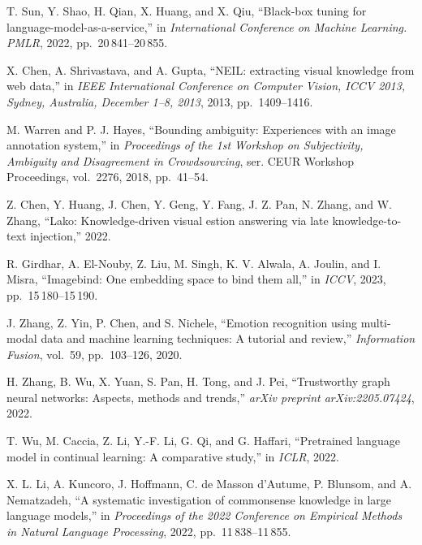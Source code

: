 \begin{enumerate}[leftmargin=2em,label={[\arabic*]}]
\item T. Sun, Y. Shao, H. Qian, X. Huang, and X. Qiu, ``Black-box tuning for language-model-as-a-service,'' in \textit{International Conference on Machine Learning. PMLR}, 2022, pp.~20\,841--20\,855.

\item X. Chen, A. Shrivastava, and A. Gupta, ``NEIL: extracting visual knowledge from web data,'' in \textit{IEEE International Conference on Computer Vision, ICCV 2013, Sydney, Australia, December 1--8, 2013}, 2013, pp.~1409--1416.

\item M. Warren and P. J. Hayes, ``Bounding ambiguity: Experiences with an image annotation system,'' in \textit{Proceedings of the 1st Workshop on Subjectivity, Ambiguity and Disagreement in Crowdsourcing}, ser. CEUR Workshop Proceedings, vol.~2276, 2018, pp.~41--54.

\item Z. Chen, Y. Huang, J. Chen, Y. Geng, Y. Fang, J. Z. Pan, N. Zhang, and W. Zhang, ``Lako: Knowledge-driven visual estion answering via late knowledge-to-text injection,'' 2022.

\item R. Girdhar, A. El-Nouby, Z. Liu, M. Singh, K. V. Alwala, A. Joulin, and I. Misra, ``Imagebind: One embedding space to bind them all,'' in \textit{ICCV}, 2023, pp.~15\,180--15\,190.

\item J. Zhang, Z. Yin, P. Chen, and S. Nichele, ``Emotion recognition using multi-modal data and machine learning techniques: A tutorial and review,'' \textit{Information Fusion}, vol.~59, pp.~103--126, 2020.

\item H. Zhang, B. Wu, X. Yuan, S. Pan, H. Tong, and J. Pei, ``Trustworthy graph neural networks: Aspects, methods and trends,'' \textit{arXiv preprint arXiv:2205.07424}, 2022.

\item T. Wu, M. Caccia, Z. Li, Y.-F. Li, G. Qi, and G. Haffari, ``Pretrained language model in continual learning: A comparative study,'' in \textit{ICLR}, 2022.

\item X. L. Li, A. Kuncoro, J. Hoffmann, C. de Masson d'Autume, P. Blunsom, and A. Nematzadeh, ``A systematic investigation of commonsense knowledge in large language models,'' in \textit{Proceedings of the 2022 Conference on Empirical Methods in Natural Language Processing}, 2022, pp.~11\,838--11\,855.


\end{enumerate}
